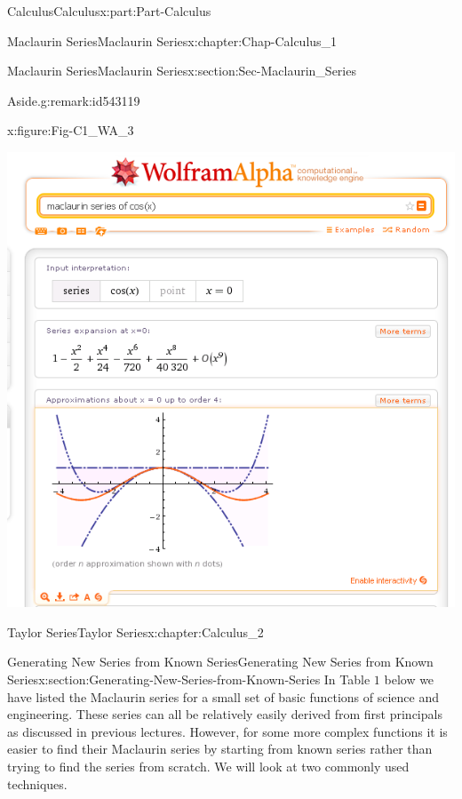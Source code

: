 \documentclass[oneside,10pt,]{book}
\numberwithin{equation}{section}
\begin{document}
\begin{partptx}{Calculus}{}{Calculus}{}{}{x:part:Part-Calculus}
\begin{chapterptx}{Maclaurin Series}{}{Maclaurin Series}{}{}{x:chapter:Chap-Calculus_1}
\begin{sectionptx}{Maclaurin Series}{}{Maclaurin Series}{}{}{x:section:Sec-Maclaurin_Series}
\begin{remark}{Aside.}{g:remark:id543119}
\begin{figureptx}{}{x:figure:Fig-C1_WA_3}{}
\begin{image}{0.05}{0.9}{0.05}
\includegraphics[width=\linewidth]{./Calculus/Images/1/C1_WA_3.png}
\end{image}%
\tcblower
\end{figureptx}%
\end{remark}
\end{sectionptx}
\end{chapterptx}
%
\typeout{************************************************}
\typeout{************************************************}
%
\begin{chapterptx}{Taylor Series}{}{Taylor Series}{}{}{x:chapter:Calculus_2}
%
%
\typeout{************************************************}
\typeout{************************************************}
%
\begin{sectionptx}{Generating New Series from Known Series}{}{Generating New Series from Known Series}{}{}{x:section:Generating-New-Series-from-Known-Series}
In Table \(1\) below we have listed the Maclaurin series for a small set of basic functions of science and engineering. These series can all be relatively easily derived from first principals as discussed in previous lectures. However, for some more complex functions it is easier to find their Maclaurin series by starting from known series rather than trying to find the series from scratch. We will look at two commonly used techniques.%

\end{sectionptx}
\end{chapterptx}
\end{partptx}
\end{document}
